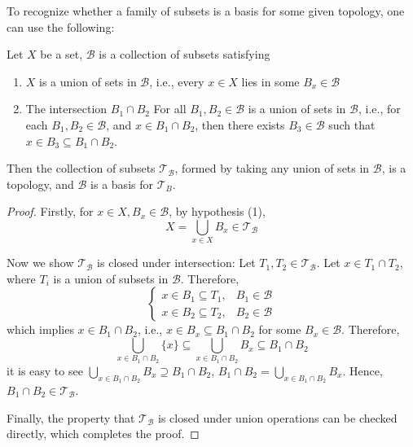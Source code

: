 To recognize whether a family of subsets is a basis for some given topology, one can use the following:
\begin{proposition} \label{prop:basis_topology} Let \(X\) be a set, \(\mathcal{B}\) is a collection of subsets satisfying

\begin{enumerate}
    \item \(X\) is a union of sets in \(\mathcal{B}\), i.e., every \(x \in  X\) lies in some \(B_x \in  \mathcal{B}\)
    \item The intersection \(B_1 \cap  B_2\) For all \(B_1,B_2 \in  \mathcal{B}\) is a union of sets in \(\mathcal{B}\), i.e., for each \(B_1,B_2 \in  \mathcal{B}\), and \(x \in  B_1 \cap  B_2\), then there exists \({B}_{3} \in  \mathcal{B}\) such that \(x \in  {B}_{3} \subseteq  B_1 \cap  B_2\).
\end{enumerate}
Then the collection of subsets \({\mathcal{T}}_{\mathcal{B}}\), formed by taking any union of sets in \(\mathcal{B}\), is a topology, and \(\mathcal{B}\) is a basis for \({\mathcal{T}}_{B}\).
\end{proposition}

\begin{proof} Firstly, for \(x \in  X,B_x \in  \mathcal{B}\), by hypothesis (1),
\[
X = \mathop{\bigcup}\limits_{{x \in  X}}B_x \in  {\mathcal{T}}_{\mathcal{B}}
\]

Now we show $\mathcal{T}_{\mathcal{B}}$ is closed under intersection: Let \({T}_{1},{T}_{2} \in  {\mathcal{T}}_{\mathcal{B}}\). Let \(x \in  {T}_{1} \cap  {T}_{2}\), where \({T}_{i}\) is a union of subsets in \(\mathcal{B}\). Therefore,
\[
\left\{  \begin{array}{ll} x \in  B_1 \subseteq  {T}_{1}, & B_1 \in  \mathcal{B} \\  x \in  B_2 \subseteq  {T}_{2}, & B_2 \in  \mathcal{B} \end{array}\right.
\]
which implies \(x \in  B_1 \cap  B_2\), i.e., \(x \in  B_x \subseteq  B_1 \cap  B_2\) for some \(B_x \in  \mathcal{B}\). Therefore,
\[
\mathop{\bigcup}\limits_{{x \in  B_1 \cap  B_2}}\{ x\}  \subseteq  \mathop{\bigcup}\limits_{{x \in  B_1 \cap  B_2}}B_x \subseteq  B_1 \cap  B_2
\]
it is easy to see \(\mathop{\bigcup}\limits_{{x \in  B_1 \cap  B_2}}B_x \supseteq  B_1 \cap  B_2\), \(B_1 \cap  B_2 = \mathop{\bigcup}\limits_{{x \in  B_1 \cap  B_2}}B_x\). Hence, \(B_1 \cap  B_2 \in  {\mathcal{T}}_{\mathcal{B}}\).

Finally, the property that \({\mathcal{T}}_{\mathcal{B}}\) is closed under union operations can be checked directly, which completes the proof.
\end{proof}

